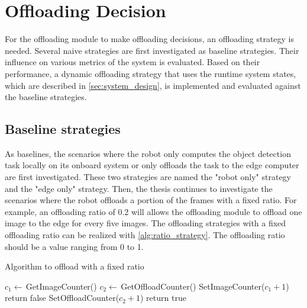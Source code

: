 \section{Offloading Decision}\label{sec:offloading_decision}

For the offloading module to make offloading decisions, an offloading strategy is needed. Several naive strategies are first investigated as baseline strategies. Their influence on various metrics of the system is evaluated. Based on their performance, a dynamic offloading strategy that uses the runtime system states, which are described in \cref{sec:system_design}, is implemented and evaluated against the baseline strategies. 

\subsection{Baseline strategies}

As baselines, the scenarios where the robot only computes the object detection task locally on its onboard system or only offloads the task to the edge computer are first investigated. These two strategies are named the "robot only" strategy and the "edge only" strategy. Then, the thesis continues to investigate the scenarios where the robot offloads a portion of the frames with a fixed ratio. For example, an offloading ratio of 0.2 will allows the offloading module to offload one image to the edge for every five images. The offloading strategies with a fixed offloading ratio can be realized with \cref{alg:ratio_strategy}. The offloading ratio should be a value ranging from 0 to 1. 

\begin{algorithm}[htp]
\caption{Algorithm to offload with a fixed ratio}\label{alg:ratio_strategy}
\begin{algorithmic}[1]
     
        \State $c_1 \gets \, $GetImageCounter()
        \State $c_2 \gets \, $GetOffloadCounter()
        \State SetImageCounter($c_1 + 1$) 
            \State return false 
        \Else
            \State SetOffloadCounter($c_2 + 1$)
            \State return true 
        \EndIf
    \EndFunction
\end{algorithmic}
\end{algorithm}

